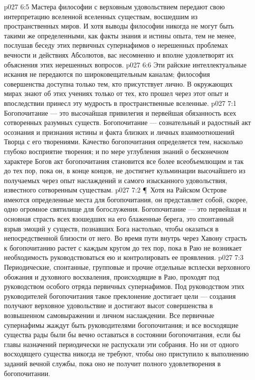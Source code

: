\vs p027 6:5 Мастера философии с верховным удовольствием передают свою интерпретацию вселенной вселенных существам, восшедшим из пространственных миров. И хотя выводы философии никогда не могут быть такими же определенными, как факты знания и истины опыта, тем не менее, послушав беседу этих первичных супернафимов о нерешенных проблемах вечности и действиях Абсолютов, вас несомненно и вполне удовлетворят их объяснения этих нерешенных вопросов.
\vs p027 6:6 Эти райские интеллектуальные искания не передаются по широковещательным каналам; философия совершенства доступна только тем, кто присутствует лично. В окружающих мирах знают об этих учениях только от тех, кто прошел через этот опыт и впоследствии принесл эту мудрость в пространственные вселенные.
\vs p027 7:1 Богопочитание --- это высочайшая привилегия и первейшая обязанность всех сотворенных разумных существ. Богопочитание --- сознательный и радостный акт осознания и признания истины и факта близких и личных взаимоотношений Творца с его творениями. Качество богопочитания определяется тем, насколько глубоко восприятие творения; и по мере углубления знаний о бесконечном характере Богов акт богопочитания становится все более всеобъемлющим и так до тех пор, пока он, в конце концов, не достигнет кульминации высочайшего из получаемых через опыт наслаждений и самого изысканного удовольствия, известного сотворенным существам.
\vs p027 7:2 \P\ Хотя на Райском Острове имеются определенные места для богопочитания, он представляет собой, скорее, одно огромное святилище для богослужения. Богопочитание --- это первейшая и основная страсть всех взошедших на его блаженные берега, это спонтанный взрыв эмоций у существ, познавших Бога настолько, чтобы оказаться в непосредственной близости от него. Во время пути внутрь через Хавону страсть к богопочитанию растет с каждым кругом до тех пор, пока в Раю не возникает необходимость руководствоваться ею и контролировать ее проявления.
\vs p027 7:3 Периодические, спонтанные, групповые и прочие отдельные всплески верховного обожания и духовного восхваления, происходящие в Раю, проходят под руководством особого отряда первичных супернафимов. Под руководством этих руководителей богопочитания такое преклонение достигает цели --- создания получают верховное удовольствие и достигают высот совершенства в возвышенном самовыражении и личном наслаждении. Все первичные супернафимы жаждут быть руководителями богопочитания; и все восходящие существа рады были бы вечно оставаться в состоянии богопочитания, если бы главы назначений периодически не распускали эти собрания. Но ни от одного восходящего существа никогда не требуют, чтобы оно приступило к выполнению заданий вечной службы, пока оно не получит полного удовлетворения в богопочитании.

